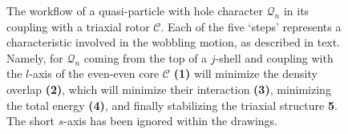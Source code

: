 \documentclass[12pt]{article}
\begin{document}
\begin{figure}
    
    \caption{The workflow of a quasi-particle with hole character $\mathcal{Q}_n$ in its coupling with a triaxial rotor $\mathscr{C}$. Each of the five `steps' represents a characteristic involved in the wobbling motion, as described in text. Namely, for $\mathcal{Q}_n$ coming from the top of a $j$-shell and coupling with the $l$-axis of the even-even core $\mathscr{C}$ \textbf{(1)} will minimize the density overlap \textbf{(2)}, which will minimize their interaction \textbf{(3)}, minimizing the total energy \textbf{(4)}, and finally stabilizing the triaxial structure \textbf{5}. The short $s$-axis has been ignored within the drawings.}
    \label{advanced-quasiparticle-coupling-2}
\end{figure}
\end{document}
